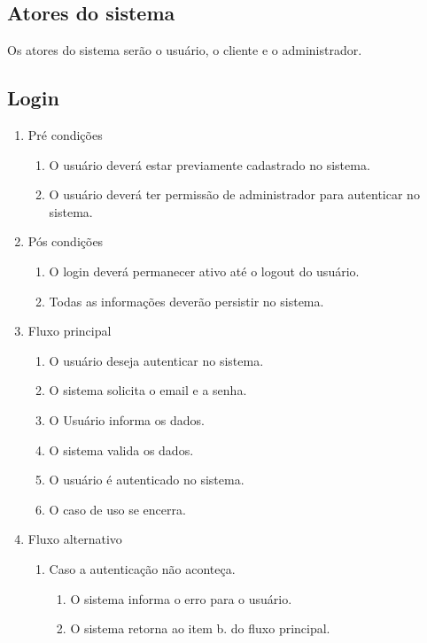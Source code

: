 \subsection{Atores do sistema}
Os atores do sistema serão o usuário, o cliente e o administrador.
\subsection{Login}
\begin{enumerate}
	\item Pré condições
		\begin{enumerate}
			\item O usuário deverá estar previamente cadastrado no sistema.
			\item O usuário deverá ter permissão de administrador para autenticar no sistema.
		\end{enumerate}
	\item Pós condições
		\begin{enumerate}
			\item O login deverá permanecer ativo até o logout do usuário.
			\item Todas as informações deverão persistir no sistema.
		\end{enumerate}
	\item Fluxo principal
		\begin{enumerate}
			\item O usuário deseja autenticar no sistema.
			\item O sistema solicita o email e a senha.
			\item O Usuário informa os dados.
			\item O sistema valida os dados.
			\item O usuário é autenticado no sistema.
			\item O caso de uso se encerra.
		\end{enumerate}
	\item Fluxo alternativo
		\begin{enumerate}
			\item Caso a autenticação não aconteça.
				\begin{enumerate}
					\item O sistema informa o erro para o usuário.
					\item O sistema retorna ao item b. do fluxo principal.
				\end{enumerate}		
		\end{enumerate}
\end{enumerate}

